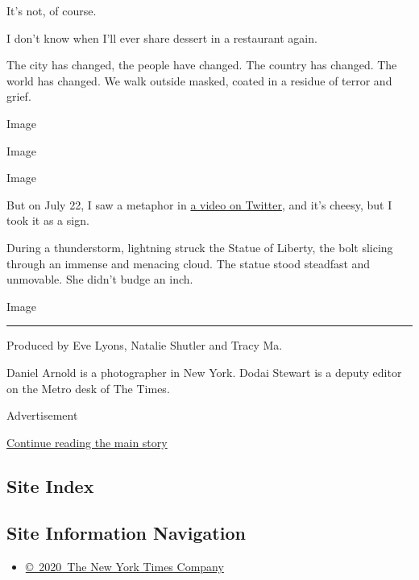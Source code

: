 It's not, of course.

I don't know when I'll ever share dessert in a restaurant again.

The city has changed, the people have changed. The country has changed.
The world has changed. We walk outside masked, coated in a residue of
terror and grief.

Image

Image

Image

But on July 22, I saw a metaphor in
\href{https://twitter.com/_Mikey_Cee/status/1286074510488350720}{a video
on Twitter}, and it's cheesy, but I took it as a sign.

During a thunderstorm, lightning struck the Statue of Liberty, the bolt
slicing through an immense and menacing cloud. The statue stood
steadfast and unmovable. She didn't budge an inch.

Image

\begin{center}\rule{0.5\linewidth}{\linethickness}\end{center}

Produced by Eve Lyons, Natalie Shutler and Tracy Ma.

Daniel Arnold is a photographer in New York. Dodai Stewart is a deputy
editor on the Metro desk of The Times.

Advertisement

\protect\hyperlink{after-bottom}{Continue reading the main story}

\hypertarget{site-index}{%
\subsection{Site Index}\label{site-index}}

\hypertarget{site-information-navigation}{%
\subsection{Site Information
Navigation}\label{site-information-navigation}}

\begin{itemize}
\tightlist
\item
  \href{https://help.nytimes.com/hc/en-us/articles/115014792127-Copyright-notice}{©~2020~The
  New York Times Company}
\end{itemize}

